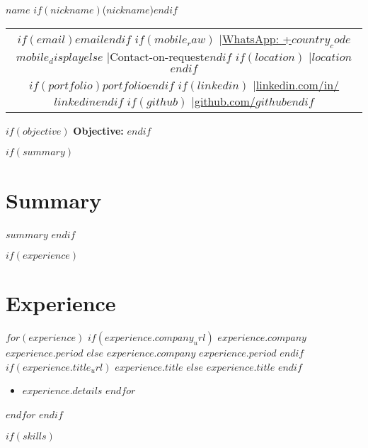 \documentclass[10.5pt,a4paper]{article}
\newcommand{\daterange}[1]{\textbf{#1}}
\newcommand{\entryHeader}[2]{\noindent\textbf{#1} \hfill \daterange{#2}}
\newcommand{\entryHeaderLinked}[3]{\noindent\textbf{\href{#1}{#2}} \hfill \daterange{#3}}
\newcommand{\entrySubHeader}[1]{\textit{#1}}
\newcommand{\entrySubHeaderLinked}[2]{\textit{\href{#1}{#2}}}
\newenvironment{entryDetails}
  {%
    \begin{itemize}[leftmargin=2.5em, rightmargin=2.5em, itemsep=0.5pt, topsep=1pt, parsep=0pt]
  }
  {%
    \end{itemize}
    \vspace{-0.1cm}
  }
\begin{document}

\begin{center}
	{\Huge \textbf{\helveticabold $name$} $if(nickname)$(\helveticabold $nickname$)$endif$} \\
	\vspace{2pt}
	\begin{tabular}{@{}c@{}}
		$if(email)$\href{mailto:$email$}{$email$}$endif$
		$if(mobile_raw)$ \quad|\quad \href{https://wa.me/$country_code$$mobile_raw$}{WhatsApp: +$country_code$ $mobile_display$}$else$ \quad|\quad Contact-on-request$endif$
		$if(location)$ \quad|\quad $location$$endif$                                                          \\[2pt]
		$if(portfolio)$\href{https://$portfolio$?utm_source=resume & utm_medium=document}{$portfolio$}$endif$
		$if(linkedin)$ \quad|\quad \href{https://www.linkedin.com/in/$linkedin$}{linkedin.com/in/$linkedin$}$endif$
		$if(github)$ \quad|\quad \href{https://github.com/$github$}{github.com/$github$}$endif$
	\end{tabular}
\end{center}

$if(objective)$
{\large\bfseries\color{sectioncolor}Objective:} 
\vspace{3pt}
$endif$

$if(summary)$
\section*{Summary}
$summary$
$endif$

$if(experience)$
\section*{Experience}
$for(experience)$
$if(experience.company_url)$
\entryHeaderLinked{$experience.company_url$}{$experience.company$}{$experience.period$}
$else$
\entryHeader{$experience.company$}{$experience.period$}
$endif$
\\
$if(experience.title_url)$
\entrySubHeaderLinked{$experience.title_url$}{$experience.title$}
$else$
\entrySubHeader{$experience.title$}
$endif$
\begin{entryDetails}
	$for(experience.details)$
	\item $experience.details$
	$endfor$
\end{entryDetails}
$endfor$
$endif$

$if(skills)$
\end{document}
